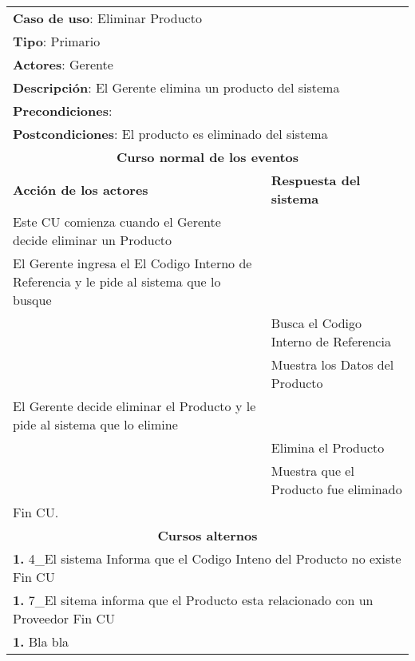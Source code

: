 \begin{longtable}{ |p{8cm}|p{8cm}| }
		\hline
		\multicolumn{2}{|p{16cm}|}{\textbf{Caso de uso}: Eliminar Producto }\\
		\multicolumn{2}{|p{16cm}|}{\textbf{Tipo}: Primario }\\
		\multicolumn{2}{|p{16cm}|}{\textbf{Actores}: Gerente }\\
		\multicolumn{2}{|p{16cm}|}{\textbf{Descripción}: El Gerente elimina un producto del sistema }\\
		\multicolumn{2}{|p{16cm}|}{\textbf{Precondiciones}: }\\
		\multicolumn{2}{|p{16cm}|}{\textbf{Postcondiciones}:  El producto es eliminado del sistema  }\\
		\hline
		\multicolumn{2}{|c|}{\textbf{Curso normal de los eventos}}\\
		\hline
		\textbf{Acción de los actores} & \textbf{Respuesta del sistema}\\
		\hline
			\inc Este CU comienza cuando el Gerente decide eliminar un Producto & \\
			\hline
			\inc El Gerente ingresa el El Codigo Interno de Referencia y le pide al sistema que lo busque &  \\
			\hline
			& \inc Busca el Codigo Interno de Referencia \\
			\hline
			& \inc Muestra los Datos del Producto \\
			\hline
			\inc El Gerente decide eliminar el Producto y le pide al sistema que lo elimine &\\
			\hline
			& \inc Elimina el Producto \\
			\hline
			& \inc Muestra que el Producto fue eliminado \\
			\hline
			\inc Fin CU. & \\
		\hline
		\multicolumn{2}{|c|}{\textbf{Cursos alternos}}\\
		\hline
		\multicolumn{2}{|p{16cm}|}{\textbf{1. }4_El sistema Informa que el Codigo Inteno del Producto no existe Fin CU}\\
		\hline
		\multicolumn{2}{|p{16cm}|}{\textbf{1. }7_El sitema informa que el Producto esta relacionado con un Proveedor Fin CU}\\
		\hline
		\multicolumn{2}{|p{16cm}|}{\textbf{1. }Bla bla }\\
		\hline	
	\end{longtable}